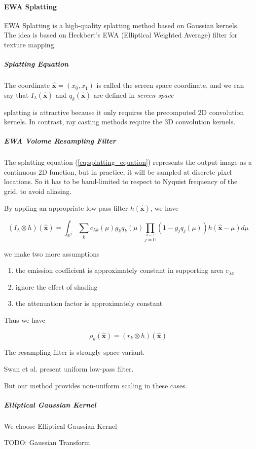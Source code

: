 \paragraph{EWA Splatting}

EWA Splatting \cite{zwickerEWAVolumeSplatting2001} \cite{zwickerEWASplatting2002} 
is a high-quality splatting method based on Gaussian kernels.
The idea is based on Heckbert's EWA (Elliptical Weighted Average) filter for texture mapping.

\subparagraph{Splatting Equation}



The coordinate $\hat{\mathbf{x}}=(x_0,x_1)$ is called 
the screen space coordinate, and we can say that 
$I_\lambda(\hat{\mathbf{x}})$ and $q_k(\hat{\mathbf{x}})$
are defined in \textit{screen space}

splatting is attractive because it only requires the 
precomputed 2D convolution kernels. In contrast, ray
casting methods require the 3D convolution kernels.

\subparagraph{EWA Volome Resampling Filter}

The splatting equation (\ref{eq:splatting_equation}) represents
the output image as a continuous 2D function, 
but in practice, it will be sampled at discrete pixel locations.
So it has to be band-limited to respect to Nyquist frequency of the grid, 
to avoid aliasing.

By appling an appropriate low-pass filter $h(\hat{\mathbf{x}})$,
we have 

$$(I_\lambda \otimes h)(\hat{\mathbf{x}})=
    \int_{\mathbb{R}^2}\sum\limits_{k }\limits^{} 
    c_{\lambda k}(\mu)g_kq_k(\mu)\prod\limits_{j=0}\limits^{k-1} 
    (1-g_jq_j(\mu))h(\hat{\mathbf{x}}-\mu)d\mu $$

we make two more assumptions

\begin{enumerate}
    \item the emission coefficient is approximately constant in supporting area $c_{\lambda x}$
    \item ignore the effect of shading 
    \item the attenuation factor is approximately constant 
\end{enumerate}

Thus we have 

$$\rho_k(\hat{\mathbf{x}})=(r_k \otimes h)(\hat{\mathbf{x}})$$

The resampling filter is strongly space-variant.

Swan et al. present uniform low-pass filter.

But our method provides non-uniform scaling in these cases.

\subparagraph{Elliptical Gaussian Kernel}

We choose Elliptical Gaussian Kernel 

TODO: Gaussian Transform